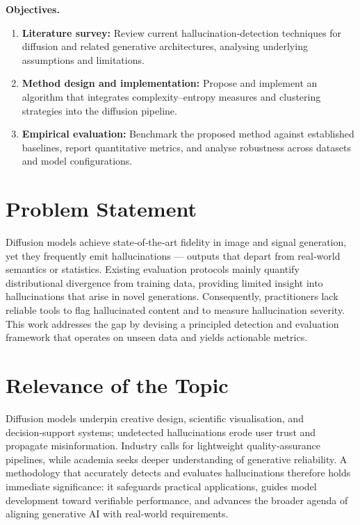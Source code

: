 \documentclass{article}
\begin{document}
\medskip
\noindent\textbf{Objectives.}
\begin{enumerate}
\item \textbf{Literature survey:} Review current hallucination‑detection
      techniques for diffusion and related generative architectures,
      analysing underlying assumptions and limitations.
\item \textbf{Method design and implementation:} Propose and implement an
      algorithm that integrates complexity–entropy measures and
      clustering strategies into the diffusion pipeline.
\item \textbf{Empirical evaluation:} Benchmark the proposed method
      against established baselines, report quantitative metrics, and
      analyse robustness across datasets and model configurations.
\end{enumerate}

\section{Problem Statement}\label{sec:problem}

Diffusion models achieve state‑of‑the‑art fidelity in image and signal
generation, yet they frequently emit hallucinations — outputs that
depart from real‑world semantics or statistics.  Existing evaluation
protocols mainly quantify distributional divergence from training
data, providing limited insight into hallucinations that arise in
novel generations.  Consequently, practitioners lack reliable tools
to flag hallucinated content and to measure hallucination severity.
This work addresses the gap by devising a principled detection and
evaluation framework that operates on unseen data and yields
actionable metrics.

\section{Relevance of the Topic}\label{sec:relevance}

Diffusion models underpin creative design, scientific visualisation,
and decision‑support systems; undetected hallucinations erode user
trust and propagate misinformation.  Industry calls for lightweight
quality‑assurance pipelines, while academia seeks deeper understanding
of generative reliability.  A methodology that accurately detects and
evaluates hallucinations therefore holds immediate significance: it
safeguards practical applications, guides model development toward
verifiable performance, and advances the broader agenda of aligning
generative AI with real‑world requirements.
\end{document}
